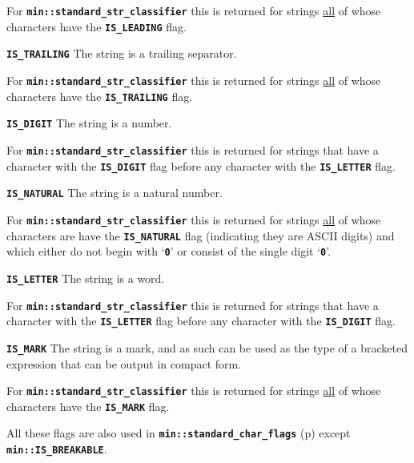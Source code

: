 \documentclass[12pt]{article}
\makeatletter
\newcommand{\TT}[1]{{\tt \bfseries #1}}
\newcommand{\ttmkey}[2]{\TT{#1}\index{#1@{\tt #1}!#2}}
\newcommand{\pagref}[1]{p\pageref{#1}}
\newcommand{\EOL}{\penalty \exhyphenpenalty}
\newenvironment{itemlist}[1][1.2in]%
	{\begin{list}{}{\setlength{\labelwidth}{#1}%
		        \setlength{\leftmargin}{\labelwidth}%
		        \addtolength{\leftmargin}{+0.2in}%
		        \renewcommand{\makelabel}[1]{##1\hfill}}}%
	{\end{list}}
\makeatother
\begin{document}
\begin{itemlist}[1.5in]
For \TT{min::\EOL standard\_\EOL str\_\EOL classifier}
this is returned for strings \underline{all} of whose characters
have the \TT{IS\_\EOL LEADING} flag.

\item[\ttmkey{IS\_TRAILING}{{\tt min::str\_classifier} flag}]%
\label{IS_TRAILING_CLASSIFIER}
The string is a trailing separator.

For \TT{min::\EOL standard\_\EOL str\_\EOL classifier}
this is returned for strings \underline{all} of whose characters
have the \TT{IS\_\EOL TRAILING} flag.

\item[\ttmkey{IS\_DIGIT}{{\tt min::str\_classifier} flag}]%
\label{IS_DIGIT_CLASSIFIER}
The string is a number.

For \TT{min::\EOL standard\_\EOL str\_\EOL classifier} this is
returned for strings that have a character with the \TT{IS\_\EOL DIGIT}
flag before any character with the \TT{IS\_\EOL LETTER} flag.

\item[\ttmkey{IS\_NATURAL}{{\tt min::str\_classifier} flag}]%
\label{IS_NATURAL_CLASSIFIER}
The string is a natural number.

For \TT{min::\EOL standard\_\EOL str\_\EOL classifier} this is
returned for strings \underline{all} of whose characters are have the
\TT{IS\_\EOL NATURAL} flag (indicating they are ASCII digits) and which
either do not begin with `\TT{0}' or consist of the single digit `\TT{0}'.

\item[\ttmkey{IS\_LETTER}{{\tt min::str\_classifier} flag}]%
\label{IS_LETTER_CLASSIFIER}
The string is a word.

For \TT{min::\EOL standard\_\EOL str\_\EOL classifier} this is
returned for strings that have a character with the \TT{IS\_\EOL LETTER}
flag before any character with the \TT{IS\_\EOL DIGIT} flag.

\item[\ttmkey{IS\_MARK}{{\tt min::str\_classifier} flag}]%
\label{IS_MARK_CLASSIFIER}
The string is a mark, and as such can be used as the type of
a bracketed expression that can be output in compact form.

For \TT{min::\EOL standard\_\EOL str\_\EOL classifier} this is
returned for strings \underline{all} of whose characters
have the \TT{IS\_MARK} flag.
\end{itemlist}

All these flags are also used in
\TT{min::\EOL standard\_\EOL char\_\EOL flags}
(\pagref{STANDARD_CHAR_FLAGS_FLAGS}) except
\TT{min::\EOL IS\_\EOL BREAK\-ABLE}.
\end{document}
